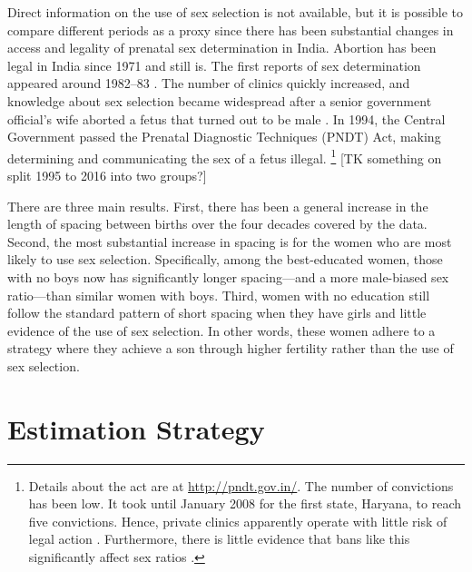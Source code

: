 \documentclass[12pt,letterpaper]{article}
\begin{document}
Direct information on the use of sex selection is not available, but it is possible
to compare different periods as a proxy since there has been substantial changes in access 
and legality of prenatal sex determination in India.
Abortion has been legal in India since 1971 and still is.
The first reports of sex determination appeared around 
1982--83 \citep{Sudha1999,bhat06,Grover2006}.
The number of clinics quickly increased, and knowledge about sex selection 
became widespread after a senior government official's wife aborted a 
fetus that turned out to be male \citep[p.\ 598]{Sudha1999}.
In 1994, the Central Government passed the Prenatal Diagnostic Techniques 
(PNDT) Act, making determining and communicating the sex of a fetus illegal.%
\footnote{
Details about the act are at \href{http://pndt.gov.in/}{http://pndt.gov.in/}.
The number of convictions has been low.
It took until January 2008 for the first state, Haryana, to reach five convictions.
Hence, private clinics apparently operate with little risk of legal action 
\citep{Sudha1999}.
Furthermore, there is little evidence that bans like this significantly
affect sex ratios \citep{Das-Gupta2016}.
}
[TK something on split 1995 to 2016 into two groups?]



There are three main results.
First, there has been a general increase in the length of spacing between births
over the four decades covered by the data.
Second, the most substantial increase in spacing is for the women who
are most likely to use sex selection.
Specifically, among the best-educated women, those with no boys now has 
significantly longer spacing---and a more male-biased sex ratio---than 
similar women with boys.
Third, women with no education still follow the standard pattern of
short spacing when they have girls and little evidence of the use of sex
selection.
In other words, these women adhere to a strategy where they achieve a
son through higher fertility rather than the use of sex selection.






\section{Estimation Strategy\label{sec:strategy}}

\end{document}
